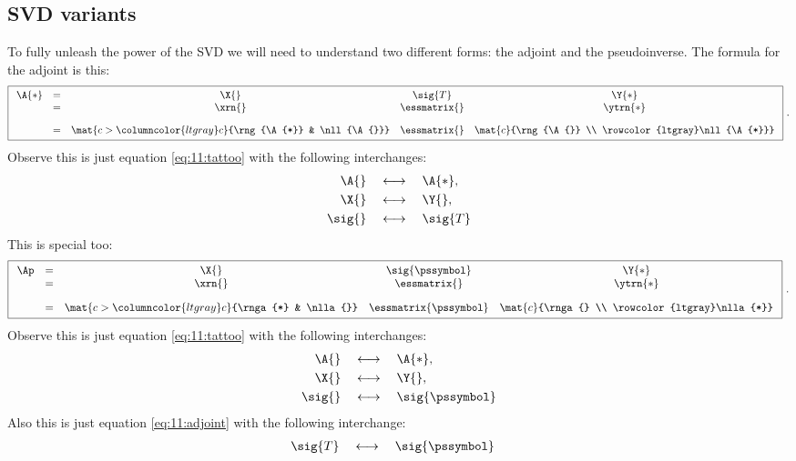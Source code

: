 \subsection{SVD variants}
To fully unleash the power of the SVD we will need to understand two different forms: the adjoint and the pseudoinverse. The formula for the adjoint is this:
\begin{equation}
\boxed{
  \begin{array}{ccccc}
  \A{*} & = & \X{} & \sig{T} & \Y{*} \\
    & = & \xrn{}
        & \essmatrix{} 
        & \ytrn{*}  \\[10pt]
    & = & \mat{c>{\columncolor{ltgray}}c}{\rng{\A{*}} & \nll{\A{}}} 
        & \essmatrix{} 
        & \mat{c}{\rng{\A{}} \\ \rowcolor{ltgray}\nll{\A{*}}}
  \end{array}  
  } \ .
  \label{eq:11:adjoint}
\end{equation}
Observe this is just equation \eqref{eq:11:tattoo} with the following interchanges:
\begin{equation}
  \begin{split}
     \A{} \quad   &\longleftrightarrow \quad \A{*},\\
     \X{} \quad   &\longleftrightarrow \quad \Y{},\\
     \sig{} \quad &\longleftrightarrow \quad \sig{T}
  \end{split}
\end{equation}
This is special too:
\begin{equation}
\boxed{
  \begin{array}{ccccc}
  \Ap & = & \X{} & \sig{\pssymbol} & \Y{*} \\
    & = & \xrn{}
        & \essmatrix{} 
        & \ytrn{*}  \\[10pt]
    & = & \mat{c>{\columncolor{ltgray}}c}{\rnga{*} & \nlla{}} 
        & \essmatrix{\pssymbol} 
        & \mat{c}{\rnga{} \\ \rowcolor{ltgray}\nlla{*}}
  \end{array}  
  } \ .
  \label{eq:11:adjoint}
\end{equation}
Observe this is just equation \eqref{eq:11:tattoo} with the following interchanges:
\begin{equation}
  \begin{split}
     \A{} \quad   &\longleftrightarrow \quad \A{*},\\
     \X{} \quad   &\longleftrightarrow \quad \Y{},\\
     \sig{} \quad &\longleftrightarrow \quad \sig{\pssymbol}
  \end{split}
\end{equation}
Also this is just equation \eqref{eq:11:adjoint} with the following interchange:
\begin{equation}
  \begin{split}
     \sig{T} \quad &\longleftrightarrow \quad \sig{\pssymbol}
  \end{split}
\end{equation}

\endinput
